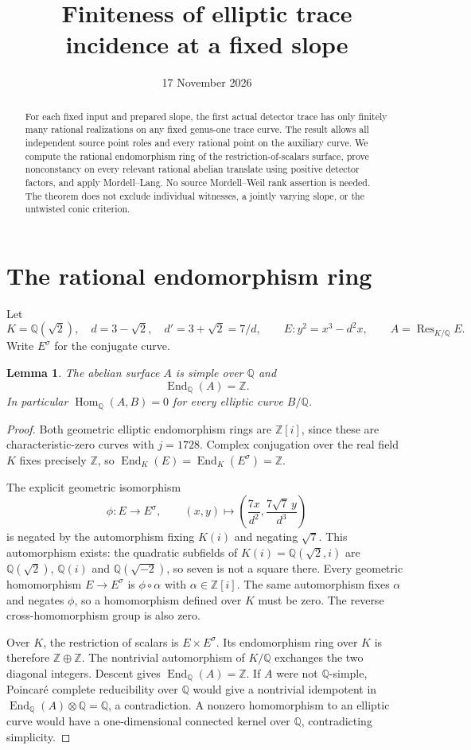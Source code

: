 \documentclass[11pt,a4paper]{article}
\title{Finiteness of elliptic trace incidence at a fixed slope}
\author{}\date{17 November 2026}
\newtheorem{lemma}[theorem]{Lemma}
\newcommand{\Q}{\mathbb Q}\newcommand{\Z}{\mathbb Z}
\DeclareMathOperator{\Res}{Res}\DeclareMathOperator{\Tr}{Tr}
\DeclareMathOperator{\Hom}{Hom}\DeclareMathOperator{\End}{End}
\begin{document}
\maketitle
\begin{abstract}
For each fixed input and prepared slope, the first actual detector
trace has only finitely many rational realizations on any fixed
genus-one trace curve. The result allows all independent source
point roles and every rational point on the auxiliary curve. We
compute the rational endomorphism ring of the restriction-of-scalars
surface, prove nonconstancy on every relevant rational abelian
translate using positive detector factors, and apply Mordell--Lang.
No source Mordell--Weil rank assertion is needed. The theorem does
not exclude individual witnesses, a jointly varying slope, or the
untwisted conic criterion.
\end{abstract}

\section{The rational endomorphism ring}
Let
\[
 K=\Q(\sqrt2),\quad d=3-\sqrt2,\quad d'=3+\sqrt2=7/d,
 \qquad E:y^2=x^3-d^2x,\qquad A=\Res_{K/\Q}E.
\]
Write $E^\sigma$ for the conjugate curve.

\begin{lemma}\label{lem:end}
The abelian surface $A$ is simple over $\Q$ and
\[
                         \End_{\Q}(A)=\Z.
\]
In particular $\Hom_{\Q}(A,B)=0$ for every elliptic curve
$B/\Q$.
\end{lemma}
\begin{proof}
Both geometric elliptic endomorphism rings are $\Z[i]$, since
these are characteristic-zero curves with $j=1728$.
Complex conjugation over the real field $K$ fixes precisely $\Z$,
so $\End_K(E)=\End_K(E^\sigma)=\Z$.

The explicit geometric isomorphism
\[
 \phi:E\longrightarrow E^\sigma,\qquad
 (x,y)\longmapsto
       \left(\frac{7x}{d^2},\frac{7\sqrt7\,y}{d^3}\right)
\]
is negated by the automorphism fixing $K(i)$ and negating $\sqrt7$.
This automorphism exists: the quadratic subfields of
$K(i)=\Q(\sqrt2,i)$ are $\Q(\sqrt2)$, $\Q(i)$ and
$\Q(\sqrt{-2})$, so seven is not a square there.
Every geometric homomorphism $E\to E^\sigma$ is
$\phi\circ\alpha$ with $\alpha\in\Z[i]$. The same automorphism
fixes $\alpha$ and negates $\phi$, so a homomorphism defined over
$K$ must be zero. The reverse cross-homomorphism group is also zero.

Over $K$, the restriction of scalars is $E\times E^\sigma$.
Its endomorphism ring over $K$ is therefore $\Z\oplus\Z$.
The nontrivial automorphism of $K/\Q$ exchanges the two diagonal
integers. Descent gives $\End_{\Q}(A)=\Z$. If $A$ were not
$\Q$-simple, Poincar\'e complete reducibility over $\Q$
\cite[Proposition 12.1]{Milne} would give a nontrivial idempotent
in $\End_{\Q}(A)\otimes\Q=\Q$, a contradiction.
A nonzero homomorphism to an elliptic curve would have a
one-dimensional connected kernel over $\Q$, contradicting simplicity.
\end{proof}
\end{document}
